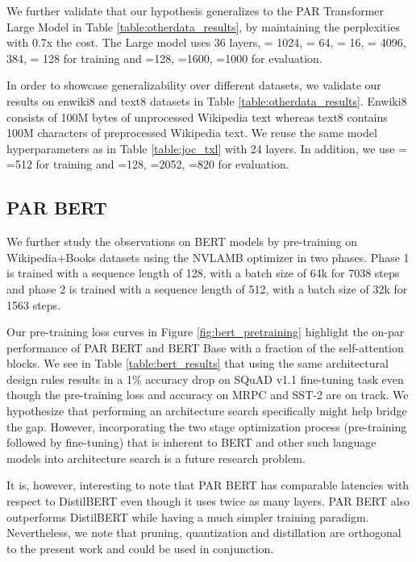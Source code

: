 \documentclass{article}
\begin{document}
We further validate that our hypothesis generalizes to the PAR Transformer Large Model in Table \ref{table:otherdata_results}, by maintaining the perplexities with 0.7x the cost. The Large model uses 36 layers,  = 1024,  = 64,  = 16,  = 4096,  384,  = 128 for training and =128, =1600, =1000 for evaluation.

In order to showcase generalizability over different datasets, we validate our results on enwiki8 and text8 datasets \cite{textenwiki} in Table \ref{table:otherdata_results}. Enwiki8 consists of 100M bytes of unprocessed Wikipedia text whereas text8 contains 100M characters of preprocessed Wikipedia text. We reuse the same model hyperparameters as in Table \ref{table:joc_txl} with 24 layers. In addition, we use  = =512 for training and =128, =2052, =820 for evaluation.


\subsection{PAR BERT}

We further study the observations on BERT models by pre-training on Wikipedia+Books datasets \cite{bookscorpus} using the NVLAMB optimizer \cite{nvlamb} in two phases. Phase 1 is trained with a sequence length of 128, with a batch size of 64k for 7038 steps and phase 2 is trained with a sequence length of 512, with a batch size of 32k for 1563 steps. 

Our pre-training loss curves in Figure \ref{fig:bert_pretraining} highlight the on-par performance of PAR BERT and BERT Base with a fraction of the self-attention blocks. We see in Table \ref{table:bert_results} that using the same architectural design rules results in a 1\% accuracy drop on SQuAD v1.1 fine-tuning task even though the pre-training loss and accuracy on MRPC and SST-2 are on track. We hypothesize that performing an architecture search specifically might help bridge the gap. However, incorporating the two stage optimization process (pre-training followed by fine-tuning) that is inherent to BERT and other such language models into architecture search is a future research problem.

It is, however, interesting to note that PAR BERT has comparable latencies with respect to DistilBERT even though it uses twice as many layers. PAR BERT also outperforms DistilBERT while having a much simpler training paradigm. Nevertheless, we note that pruning, quantization and distillation are orthogonal to the present work and could be used in conjunction.
\end{document}
